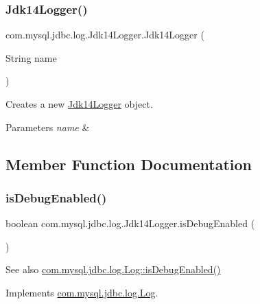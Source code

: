 \subsubsection{\texorpdfstring{Jdk14\+Logger()}{Jdk14Logger()}}
{\footnotesize\ttfamily com.\+mysql.\+jdbc.\+log.\+Jdk14\+Logger.\+Jdk14\+Logger (\begin{DoxyParamCaption}\item[{String}]{name }\end{DoxyParamCaption})}

Creates a new \mbox{\hyperlink{classcom_1_1mysql_1_1jdbc_1_1log_1_1_jdk14_logger}{Jdk14\+Logger}} object.


\begin{DoxyParams}{Parameters}
{\em name} & \\
\hline
\end{DoxyParams}


\subsection{Member Function Documentation}
\mbox{\label{classcom_1_1mysql_1_1jdbc_1_1log_1_1_jdk14_logger_ad924ecc59554c92596222f2952d5d65c}} 
\subsubsection{\texorpdfstring{is\+Debug\+Enabled()}{isDebugEnabled()}}
{\footnotesize\ttfamily boolean com.\+mysql.\+jdbc.\+log.\+Jdk14\+Logger.\+is\+Debug\+Enabled (\begin{DoxyParamCaption}{ }\end{DoxyParamCaption})}

\begin{DoxySeeAlso}{See also}
\mbox{\hyperlink{interfacecom_1_1mysql_1_1jdbc_1_1log_1_1_log_a2e59f38e2359e90879c658cfb2f4e518}{com.\+mysql.\+jdbc.\+log.\+Log\+::is\+Debug\+Enabled()}} 
\end{DoxySeeAlso}


Implements \mbox{\hyperlink{interfacecom_1_1mysql_1_1jdbc_1_1log_1_1_log_a2e59f38e2359e90879c658cfb2f4e518}{com.\+mysql.\+jdbc.\+log.\+Log}}.

